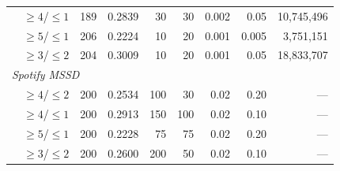 \begin{table}[ht]
\begin{tabular}{llrrrrrrr}
              & ${\geq}4$/${\leq}1$ & 189 & 0.2839 & 30  & 30 & 0.002 & 0.05  & 10{,}745{,}496 \\
              & ${\geq}5$/${\leq}1$ & 206 & 0.2224 & 10  & 20 & 0.001 & 0.005 & 3{,}751{,}151 \\
              & ${\geq}3$/${\leq}2$ & 204 & 0.3009 & 10  & 20 & 0.001 & 0.05  & 18{,}833{,}707 \\
\midrule
\multicolumn{9}{l}{\textit{Spotify MSSD}} \\
              & ${\geq}4$/${\leq}2$ & 200 & 0.2534 & 100 & 30 & 0.02  & 0.20  & --- \\
              & ${\geq}4$/${\leq}1$ & 200 & 0.2913 & 150 & 100 & 0.02 & 0.10  & --- \\
              & ${\geq}5$/${\leq}1$ & 200 & 0.2228 & 75  & 75 & 0.02  & 0.20  & --- \\
              & ${\geq}3$/${\leq}2$ & 200 & 0.2600 & 200 & 50 & 0.02  & 0.10  & --- \\
\bottomrule
\end{tabular}
\end{table}
